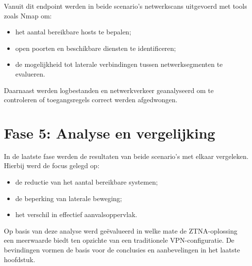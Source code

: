 Vanuit dit endpoint werden in beide scenario’s netwerkscans uitgevoerd met tools zoals Nmap om:
\begin{itemize}
	\item het aantal bereikbare hosts te bepalen;
	\item open poorten en beschikbare diensten te identificeren;
	\item de mogelijkheid tot laterale verbindingen tussen netwerksegmenten te evalueren.
\end{itemize}

Daarnaast werden logbestanden en netwerkverkeer geanalyseerd om te controleren of toegangsregels correct werden afgedwongen.

\section{Fase 5: Analyse en vergelijking}

In de laatste fase werden de resultaten van beide scenario’s met elkaar vergeleken. Hierbij werd de focus gelegd op:
\begin{itemize}
	\item de reductie van het aantal bereikbare systemen;
	\item de beperking van laterale beweging;
	\item het verschil in effectief aanvalsoppervlak.
\end{itemize}

Op basis van deze analyse werd geëvalueerd in welke mate de ZTNA-oplossing een meerwaarde biedt ten opzichte van een traditionele VPN-configuratie. De bevindingen vormen de basis voor de conclusies en aanbevelingen in het laatste hoofdstuk.

